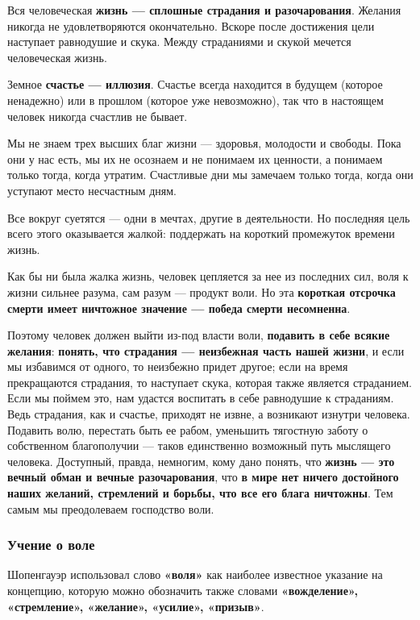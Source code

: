 \documentclass{article}
\begin{document}
\begin{flushleft}

Вся человеческая \textbf{жизнь — сплошные страдания и разочарования}. Желания никогда не удовлетворяются окончательно. Вскоре после достижения цели наступает равнодушие и скука. Между страданиями и скукой мечется человеческая жизнь.

Земное \textbf{счастье — иллюзия}. Счастье всегда находится в будущем (которое ненадежно) или в прошлом (которое уже невозможно), так что в настоящем человек никогда счастлив не бывает.

Мы не знаем трех высших благ жизни — здоровья, молодости и свободы. Пока они у нас есть, мы их не осознаем и не понимаем их ценности, а понимаем только тогда, когда утратим. Счастливые дни мы замечаем только тогда, когда они уступают место несчастным дням.

Все вокруг суетятся — одни в мечтах, другие в деятельности. Но последняя цель всего этого оказывается жалкой: поддержать на короткий промежуток времени жизнь.

Как бы ни была жалка жизнь, человек цепляется за нее из последних сил, воля к жизни сильнее разума, сам разум — продукт воли. Но эта \textbf{короткая отсрочка смерти имеет ничтожное значение — победа смерти несомненна}.

Поэтому человек должен выйти из-под власти воли, \textbf{подавить в себе всякие желания}: \textbf{понять, что страдания — неизбежная часть нашей жизни}, и если мы избавимся от одного, то неизбежно придет другое; если на время прекращаются страдания, то наступает скука, которая также является страданием. Если мы поймем это, нам удастся воспитать в себе равнодушие к страданиям. Ведь страдания, как и счастье, приходят не извне, а возникают изнутри человека. Подавить волю, перестать быть ее рабом, уменьшить тягостную заботу о собственном благополучии — таков единственно возможный путь мыслящего человека. Доступный, правда, немногим, кому дано понять, что \textbf{жизнь — это вечный обман и вечные разочарования}, что \textbf{в мире нет ничего достойного наших желаний, стремлений и борьбы, что все его блага ничтожны}. Тем самым мы преодолеваем господство воли.

\subsubsection{Учение о воле}

Шопенгауэр использовал слово \textbf{«воля»} как наиболее известное указание на концепцию, которую можно обозначить также словами \textbf{«вожделение», «стремление», «желание», «усилие», «призыв»}.


\end{flushleft}
\end{document}
